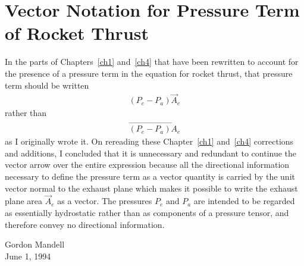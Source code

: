 \chapter{Vector Notation for Pressure Term of Rocket Thrust}\label{supp:vector}

In the parts of Chapters~\ref{ch1} and~\ref{ch4} that have been rewritten to account for the presence of a
pressure term in the equation for rocket thrust, that pressure term should be written
\begin{gather*}
(P_e - P_a)\vec{A}_e
\end{gather*}
rather than
\begin{gather*}
\overrightarrow{(P_e - P_a)A_e}
\end{gather*}
as I originally wrote it. On rereading these Chapter~\ref{ch1} and~\ref{ch4} corrections and additions, I
concluded that it is unnecessary and redundant to continue the vector arrow over the entire expression because
all the directional information necessary to define the pressure term as a vector quantity is carried by the
unit vector normal to the exhaust plane which makes it possible to write the exhaust plane area $\vec{A}_e$ as a
vector. The pressures $P_e$ and $P_a$ are intended to be regarded as essentially hydrostatic rather than as
components of a pressure tensor, and therefore convey no directional information.

\bigskip
\noindent Gordon Mandell\\
June 1, 1994
